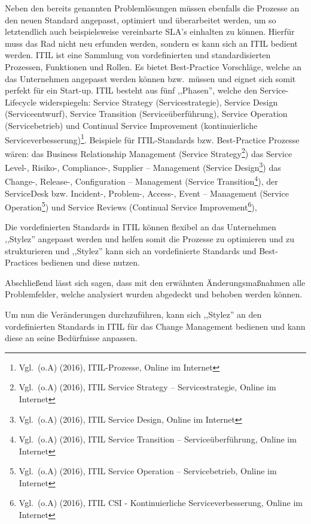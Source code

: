 Neben den bereits genannten Problemlösungen müssen ebenfalls die
Prozesse an den neuen Standard angepasst, optimiert und überarbeitet
werden, um so letztendlich auch beispielsweise vereinbarte SLA’s
einhalten zu können. Hierfür muss das Rad nicht neu erfunden werden,
sondern es kann sich an ITIL bedient werden. ITIL ist eine Sammlung
von vordefinierten und standardisierten Prozessen, Funktionen und
Rollen. Es bietet Best-Practice Vorschläge, welche an das Unternehmen
angepasst werden können bzw.~müssen und eignet sich somit perfekt für
ein Start-up. ITIL besteht aus fünf ,,Phasen'', welche den
Service-Lifecycle widerspiegeln: Service Strategy (Servicestrategie),
Service Design (Serviceentwurf), Service Transition
(Serviceüberführung), Service Operation (Servicebetrieb) und Continual
Service Improvement (kontinuierliche
Serviceverbesserung)\footnote{Vgl.~(o.A) (2016), ITIL-Prozesse, Online
  im Internet}. Beispiele für ITIL-Standards bzw. Best-Practice
Prozesse wären: das Business Relationship Management (Service
Strategy\footnote{Vgl.~(o.A) (2016), ITIL Service Strategy –
  Servicestrategie, Online im Internet}) das Service Level-, Risiko-,
Compliance-, Supplier – Management (Service Design\footnote{Vgl.~(o.A)
  (2016), ITIL Service Design, Online im Internet}) das Change-,
Release-, Configuration – Management (Service
Transition\footnote{Vgl.~(o.A) (2016), ITIL Service Transition –
  Serviceüberführung, Online im Internet}), der ServiceDesk
bzw. Incident-, Problem-, Access-, Event – Management (Service
Operation\footnote{Vgl.~(o.A) (2016), ITIL Service Operation –
  Servicebetrieb, Online im Internet}) und Service Reviews (Continual
Service Improvement\footnote{Vgl.~(o.A) (2016), ITIL CSI -
  Kontinuierliche Serviceverbesserung, Online im Internet}),

Die vordefinierten Standards in ITIL können flexibel an das
Unternehmen ,,Stylez'' angepasst werden und helfen somit die Prozesse
zu optimieren und zu strukturieren und ,,Stylez'' kann sich an
vordefinierte Standards und Best-Practices bedienen und diese nutzen.

Abschließend lässt sich sagen, dass mit den erwähnten
Änderungsmaßnahmen alle Problemfelder, welche analysiert wurden
abgedeckt und behoben werden können.

Um nun die Veränderungen durchzuführen, kann sich ,,Stylez'' an den
vordefinierten Standards in ITIL für das Change Management bedienen
und kann diese an seine Bedürfnisse anpassen.
